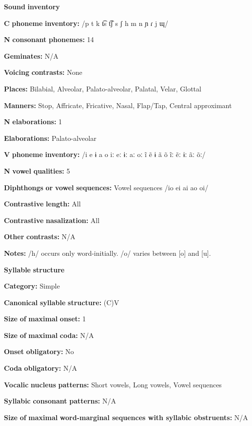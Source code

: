 \textbf{Sound} \textbf{inventory}

\textbf{C} \textbf{phoneme} \textbf{inventory:} /p t k t͡s t͡ʃ s ʃ h m n ɲ ɾ j ɰ/

\textbf{N} \textbf{consonant} \textbf{phonemes:} 14

\textbf{Geminates:} N/A

\textbf{Voicing} \textbf{contrasts:} None

\textbf{Places:} Bilabial, Alveolar, Palato-alveolar, Palatal, Velar, Glottal

\textbf{Manners:} Stop, Affricate, Fricative, Nasal, Flap/Tap, Central approximant

\textbf{N} \textbf{elaborations:} 1

\textbf{Elaborations:} Palato-alveolar

\textbf{V} \textbf{phoneme} \textbf{inventory:} /i e ɨ a o iː eː ɨː aː oː ĩ ẽ ɨ ã õ ĩː ẽː ɨː ãː õː/

\textbf{N} \textbf{vowel} \textbf{qualities:} 5

\textbf{Diphthongs} \textbf{or} \textbf{vowel} \textbf{sequences:} Vowel sequences /io ei ai ao oi/

\textbf{Contrastive} \textbf{length:} All

\textbf{Contrastive} \textbf{nasalization:} All

\textbf{Other} \textbf{contrasts:} N/A

\textbf{Notes:} /h/ occurs only word-initially. /o/ varies between [o] and [u]. 

\textbf{Syllable} \textbf{structure}

\textbf{Category:} Simple

\textbf{Canonical} \textbf{syllable} \textbf{structure:} (C)V \citep[87-90]{Facundes2000}

\textbf{Size} \textbf{of} \textbf{maximal} \textbf{onset:} 1

\textbf{Size} \textbf{of} \textbf{maximal} \textbf{coda:} N/A

\textbf{Onset} \textbf{obligatory:} No

\textbf{Coda} \textbf{obligatory:} N/A

\textbf{Vocalic} \textbf{nucleus} \textbf{patterns:} Short vowels, Long vowels, Vowel sequences

\textbf{Syllabic} \textbf{consonant} \textbf{patterns:} N/A

\textbf{Size} \textbf{of} \textbf{maximal} \textbf{word{}-marginal sequences with syllabic obstruents:}  N/A

